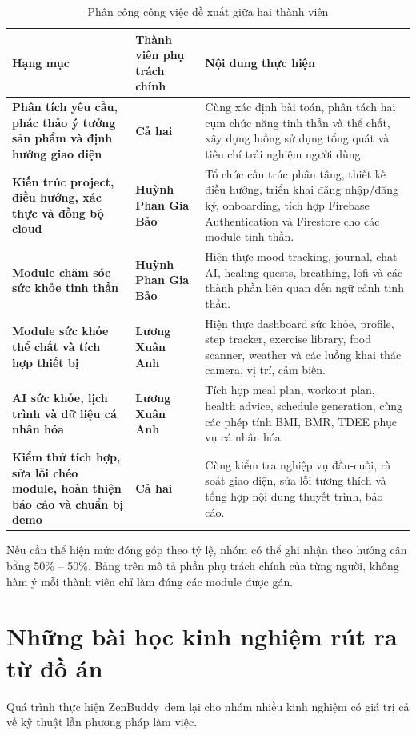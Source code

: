 \documentclass{zenbuddy-report}
\newcommand{\appname}{ZenBuddy}
\begin{document}
\begin{table}[H]
\centering
\caption{Phân công công việc đề xuất giữa hai thành viên}
\label{tab:team-allocation}
\begin{tabularx}{\textwidth}{>{\bfseries}p{4.1cm}>{\bfseries}p{3.6cm}X}
\toprule
Hạng mục & Thành viên phụ trách chính & Nội dung thực hiện \\
\midrule
Phân tích yêu cầu, phác thảo ý tưởng sản phẩm và định hướng giao diện & Cả hai & Cùng xác định bài toán, phân tách hai cụm chức năng tinh thần và thể chất, xây dựng luồng sử dụng tổng quát và tiêu chí trải nghiệm người dùng. \\
Kiến trúc project, điều hướng, xác thực và đồng bộ cloud & Huỳnh Phan Gia Bảo & Tổ chức cấu trúc phân tầng, thiết kế điều hướng, triển khai đăng nhập/đăng ký, onboarding, tích hợp Firebase Authentication và Firestore cho các module tinh thần. \\
Module chăm sóc sức khỏe tinh thần & Huỳnh Phan Gia Bảo & Hiện thực mood tracking, journal, chat AI, healing quests, breathing, lofi và các thành phần liên quan đến ngữ cảnh tinh thần. \\
Module sức khỏe thể chất và tích hợp thiết bị & Lương Xuân Anh & Hiện thực dashboard sức khỏe, profile, step tracker, exercise library, food scanner, weather và các luồng khai thác camera, vị trí, cảm biến. \\
AI sức khỏe, lịch trình và dữ liệu cá nhân hóa & Lương Xuân Anh & Tích hợp meal plan, workout plan, health advice, schedule generation, cùng các phép tính BMI, BMR, TDEE phục vụ cá nhân hóa. \\
Kiểm thử tích hợp, sửa lỗi chéo module, hoàn thiện báo cáo và chuẩn bị demo & Cả hai & Cùng kiểm tra nghiệp vụ đầu-cuối, rà soát giao diện, sửa lỗi tương thích và tổng hợp nội dung thuyết trình, báo cáo. \\
\bottomrule
\end{tabularx}
\end{table}

\begin{reportnote}
Nếu cần thể hiện mức đóng góp theo tỷ lệ, nhóm có thể ghi nhận theo hướng cân bằng 50\% -- 50\%. Bảng trên mô tả phần phụ trách chính của từng người, không hàm ý mỗi thành viên chỉ làm đúng các module được gán.
\end{reportnote}

\section{Những bài học kinh nghiệm rút ra từ đồ án}
Quá trình thực hiện \appname\ đem lại cho nhóm nhiều kinh nghiệm có giá trị cả về kỹ thuật lẫn phương pháp làm việc.
\end{document}
